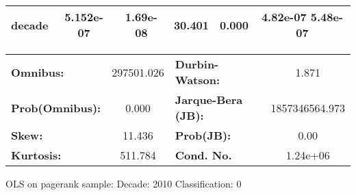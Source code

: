 \begin{center}
\begin{tabular}{lccccc}
\textbf{decade}             &    5.152e-07  &     1.69e-08     &    30.401  &         0.000        &      4.82e-07  5.48e-07       \\
\bottomrule
\end{tabular}
\begin{tabular}{lclc}
\textbf{Omnibus:}       & 297501.026 & \textbf{  Durbin-Watson:     } &       1.871     \\
\textbf{Prob(Omnibus):} &    0.000   & \textbf{  Jarque-Bera (JB):  } & 1857346564.973  \\
\textbf{Skew:}          &   11.436   & \textbf{  Prob(JB):          } &        0.00     \\
\textbf{Kurtosis:}      &  511.784   & \textbf{  Cond. No.          } &    1.24e+06     \\
\bottomrule
\end{tabular}
\end{center}
\break
OLS on pagerank sample: Decade: 2010 Classification: 0
